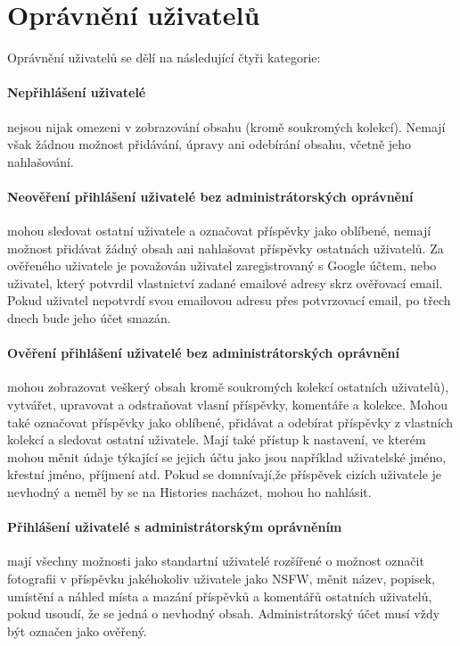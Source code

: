 \documentclass[12pt, a4paper,
 twoside,        %
 openright
]{report}
\begin{document}
\section{Oprávnění uživatelů}
Oprávnění uživatelů se dělí na následující čtyři kategorie:
\paragraph{Nepřihlášení uživatelé} nejsou nijak omezeni v zobrazování obsahu (kromě soukromých kolekcí). Nemají však žádnou možnost přidávání, úpravy ani odebírání obsahu, včetně jeho nahlašování.
\paragraph{Neověření přihlášení uživatelé bez administrátorských oprávnění} mohou sledovat ostatní uživatele a označovat příspěvky jako oblíbené, nemají možnost přidávat žádný obsah ani nahlašovat příspěvky ostatnách uživatelů. Za ověřeného uživatele je považován uživatel zaregistrovaný s Google účtem, nebo uživatel, který potvrdil vlastnictví zadané emailové adresy skrz ověřovací email. Pokud uživatel nepotvrdí svou emailovou adresu přes potvrzovací email, po třech dnech bude jeho účet smazán.
\paragraph{Ověření přihlášení uživatelé bez administrátorských oprávnění} mohou zobrazovat veškerý obsah kromě soukromých kolekcí ostatních uživatelů), vytvářet, upravovat a odstraňovat vlasní příspěvky, komentáře a kolekce. Mohou také označovat příspěvky jako oblíbené, přidávat a odebírat příspěvky z vlastních kolekcí a sledovat ostatní uživatele. Mají také přístup k nastavení, ve kterém mohou měnit údaje týkající se jejich účtu jako jsou například uživatelské jméno, křestní jméno, příjmení atd. Pokud se domnívají,že příspěvek cizích uživatele je nevhodný a neměl by se na Histories nacházet, mohou ho nahlásit.
\paragraph{Přihlášení uživatelé s administrátorským oprávněním} mají všechny možnosti jako standartní uživatelé rozšířené o možnost označit fotografii v příspěvku jakéhokoliv uživatele jako NSFW, měnit název, popisek, umístění a náhled místa a mazání příspěvků a komentářů ostatních uživatelů, pokud usoudí, že se jedná o nevhodný obsah. Administrátorský účet musí vždy být označen jako ověřený.
\end{document}
